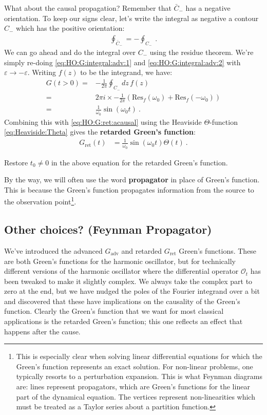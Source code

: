What about the causal propagation? Remember that $\bar C_{-}$ has a negative orientation. To keep our signs clear, let's write the integral as negative a contour $C_-$  which has the positive orientation: 
\begin{align}
	\oint_{\bar C_-} = -\oint_{C_-} \ .
\end{align}
We can go ahead and do the integral over $C_-$ using the residue theorem. We're simply re-doing \eqref{eq:HO:G:integral:adv:1} and \eqref{eq:HO:G:integral:adv:2} with $\varepsilon\to -\varepsilon$. Writing $f(z)$ to be the integrand, we have:
\begin{align}
	G(t>0) =& 
	-\frac{1}{2\pi} \oint_{C_-}dz\, f(z)
	\\
	=&
	2\pi i \times -\frac{1}{2\pi} 
	\left(\text{Res}_f(\omega_0) + \text{Res}_f(-\omega_0)\right)
	\\
	=& \frac{1}{\omega_0}\sin(\omega_0 t) \ .
\end{align}
Combining this with \eqref{eq:HO:G:ret:acausal} using the Heaviside $\Theta$-function \eqref{eq:Heaviside:Theta} gives the \textbf{retarded Green's function}:
\begin{align}
	G_\text{ret}(t) &= 
	\frac{1}{\omega_0}
	\sin(\omega_0 t)
	\Theta(t) \ .
	\label{eq:HO:Gret:sin:theta}
\end{align}
\begin{exercise}
Restore $t_0\neq 0$ in the above equation for the retarded Green's function.
\end{exercise}
By the way, we will often use the word \textbf{propagator} in place of Green's function. This is because the Green's function propagates information from the source to the observation point\footnote{This is especially clear when solving linear differential equations for which the Green's function represents an exact solution. For non-linear problems, one typically resorts to a perturbation expansion. This is what Feynman diagrams are: lines represent propagators, which are Green's functions for the linear part of the dynamical equation. The vertices represent non-linearities which must be treated as a Taylor series about a partition function.}. 


\subsection{Other choices? (Feynman Propagator)}

We've introduced the advanced $G_\text{adv}$ and retarded $G_\text{ret}$ Green's functions. These are both Green's functions for the harmonic oscillator, but for technically different versions of the harmonic oscillator where the differential operator $\mathcal O_t$ has been tweaked to make it slightly complex. We always take the complex part to zero at the end, but we have nudged the poles of the Fourier integrand over a bit and discovered that these have implications on the causality of the Green's function. Clearly the Green's function that we want for most classical applications is the retarded Green's function; this one reflects an effect that happens after the cause.

